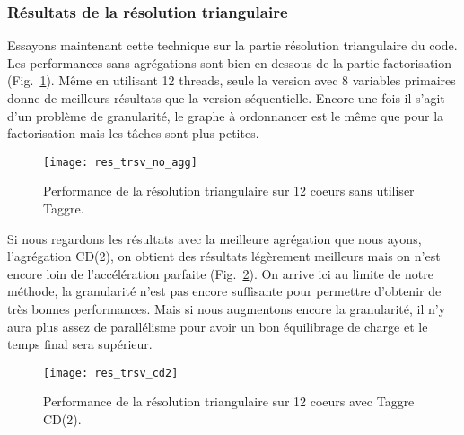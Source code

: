 \subsubsection{Résultats de la résolution triangulaire}
Essayons maintenant cette technique sur la partie résolution triangulaire du code.
%
Les performances sans agrégations sont bien en dessous de la partie factorisation (Fig.~\ref{fig:res_trsv_no_agg}).
%
Même en utilisant 12 threads, seule la version avec 8 variables primaires donne de meilleurs résultats que la version séquentielle.
%
Encore une fois il s'agit d'un problème de granularité, le graphe à ordonnancer est le même que pour la factorisation mais les tâches sont plus petites.


\begin{figure}[!h]
  \centering
  \texttt{[image: res\_trsv\_no\_agg]}
  \caption{Performance de la résolution triangulaire sur 12 coeurs sans utiliser Taggre.}
  \label{fig:res_trsv_no_agg}
\end{figure}


Si nous regardons les résultats avec la meilleure agrégation que nous ayons, l'agrégation CD(2), on obtient des résultats légèrement meilleurs mais on n'est encore loin de l'accélération parfaite (Fig.~\ref{fig:res_trsv_cd2}).
%
On arrive ici au limite de notre méthode, la granularité n'est pas encore suffisante pour permettre d'obtenir de très bonnes performances.
%
Mais si nous augmentons encore la granularité, il n'y aura plus assez de parallélisme pour avoir un bon équilibrage de charge et le temps final sera supérieur.


\begin{figure}[!h]
  \centering
  \texttt{[image: res\_trsv\_cd2]}
  \caption{Performance de la résolution triangulaire sur 12 coeurs avec Taggre CD(2).}
  \label{fig:res_trsv_cd2}
\end{figure}



